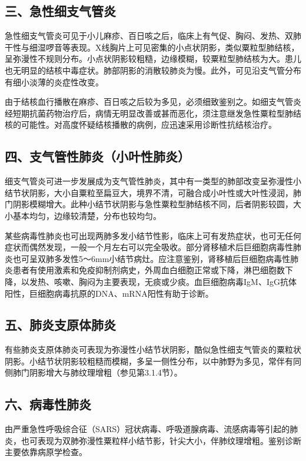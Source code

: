 \subsection{三、急性细支气管炎}

急性细支气管炎可见于小儿麻疹、百日咳之后，临床上有气促、胸闷、发热、双肺干性与细湿啰音等表现。X线胸片上可见密集的小点状阴影，类似粟粒型肺结核，呈弥漫性不规则分布。小点状阴影较粗糙，边缘模糊，较粟粒型肺结核为大。患儿也无明显的结核中毒症状。肺部阴影的消散较肺炎为慢。此外，可见沿支气管分布有细小淡薄的炎症性改变。

由于结核血行播散在麻疹、百日咳之后较为多见，必须细致鉴别之。如细支气管炎经短期抗菌药物治疗后，病情无明显改善或甚而恶化，须注意继发急性粟粒型肺结核的可能性。对高度怀疑结核播散的病例，应迅速采用诊断性抗结核治疗。

\subsection{四、支气管性肺炎（小叶性肺炎）}

细支气管炎可进一步发展成为支气管性肺炎，其中有一类型的肺部改变呈弥漫性小结节状阴影，大小自粟粒至扁豆大，境界不清，可融合成小叶性或大叶性浸润，肺门阴影模糊增大。此种小结节状阴影与急性粟粒型肺结核不同，后者阴影较圆，大小基本均匀，边缘较清楚，分布也较均匀。

某些病毒性肺炎也可出现两肺多发小结节性影，临床上可有发热症状，也可无任何症状而偶然发现，一般一个月左右可以完全吸收。部分肾移植术后巨细胞病毒性肺炎也可呈双肺多发性5～6mm小结节病灶。应注意鉴别，肾移植后巨细胞病毒性肺炎患者有使用激素和免疫抑制剂病史，外周血白细胞正常或下降，淋巴细胞数下降，以发热、咳嗽、胸闷为主要表现，无痰或少痰。血巨细胞病毒IgM、IgG抗体阳性，巨细胞病毒抗原的DNA、mRNA阳性有助于诊断。

\subsection{五、肺炎支原体肺炎}

有些肺炎支原体肺炎可表现为弥漫性小结节状阴影，酷似急性细支气管炎的粟粒状阴影。小结节状阴影较粗糙而模糊，多呈一侧性分布，以中肺野为多见，常伴有同侧肺门阴影增大与肺纹理增粗（参见第3.1.4节）。

\subsection{六、病毒性肺炎}

由严重急性呼吸综合征（SARS）冠状病毒、呼吸道腺病毒、流感病毒等引起的肺炎，也可表现为双肺弥漫性粟粒样小结节影，针尖大小，伴肺纹理增粗。鉴别诊断主要依靠病原学检查。

